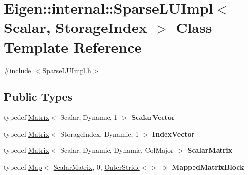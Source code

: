 \hypertarget{class_eigen_1_1internal_1_1_sparse_l_u_impl}{}\section{Eigen\+::internal\+::Sparse\+L\+U\+Impl$<$ Scalar, Storage\+Index $>$ Class Template Reference}
\label{class_eigen_1_1internal_1_1_sparse_l_u_impl}


{\ttfamily \#include $<$Sparse\+L\+U\+Impl.\+h$>$}

\subsection*{Public Types}
\begin{DoxyCompactItemize}
\item 
\mbox{\label{class_eigen_1_1internal_1_1_sparse_l_u_impl_a26f9fb6f3223dad4b18a27f42c7db62e}} 
typedef \mbox{\hyperlink{class_eigen_1_1_matrix}{Matrix}}$<$ Scalar, Dynamic, 1 $>$ {\bfseries Scalar\+Vector}
\item 
\mbox{\label{class_eigen_1_1internal_1_1_sparse_l_u_impl_aa573839120675e129e912beac087d772}} 
typedef \mbox{\hyperlink{class_eigen_1_1_matrix}{Matrix}}$<$ Storage\+Index, Dynamic, 1 $>$ {\bfseries Index\+Vector}
\item 
\mbox{\label{class_eigen_1_1internal_1_1_sparse_l_u_impl_aa26e66444befb13e4b78de402e740fb1}} 
typedef \mbox{\hyperlink{class_eigen_1_1_matrix}{Matrix}}$<$ Scalar, Dynamic, Dynamic, Col\+Major $>$ {\bfseries Scalar\+Matrix}
\item 
\mbox{\label{class_eigen_1_1internal_1_1_sparse_l_u_impl_a49d4667303265643fcf2d28dbf7ae19b}} 
typedef \mbox{\hyperlink{class_eigen_1_1_map}{Map}}$<$ \mbox{\hyperlink{class_eigen_1_1_matrix}{Scalar\+Matrix}}, 0, \mbox{\hyperlink{class_eigen_1_1_outer_stride}{Outer\+Stride}}$<$$>$ $>$ {\bfseries Mapped\+Matrix\+Block}
\item 
\mbox{\label{class_eigen_1_1internal_1_1_sparse_l_u_impl_a59f0f7d4c248cdcde9290d861e5477c0}} 
$$
\end{DoxyCompactItemize}
